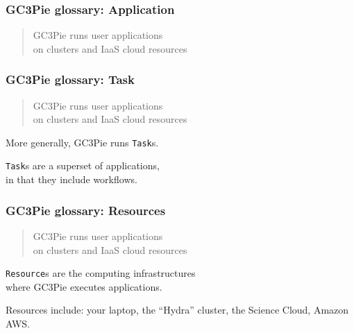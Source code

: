 \documentclass[english,serif,mathserif,usenames,dvipsnames]{beamer}
\begin{document}
\begin{frame}
  \frametitle{GC3Pie glossary: Application}
  \begin{quote}
    GC3Pie runs \alert<2-3>{user applications}
    \\
    on clusters and IaaS cloud resources
  \end{quote}

\end{frame}



\begin{frame}
  \frametitle{GC3Pie glossary: Task}
  \begin{quote}
    GC3Pie \alert{runs} user applications
    \\
    on clusters and IaaS cloud resources
  \end{quote}

  \+ More generally, GC3Pie runs \texttt{Task}s.

  \+ \texttt{Task}s are a superset of applications,
  \\ in that they include workflows.

  \+ \hyperlink{workflows}{}
\end{frame}


\begin{frame}
  \frametitle{GC3Pie glossary: Resources}
  \begin{quote}
    GC3Pie runs user applications
    \\
    on clusters and IaaS cloud \alert{resources}
  \end{quote}

  \+ \alert{\texttt{Resource}s are the computing infrastructures \\ where GC3Pie executes applications.}

  \+ Resources include: your laptop, the ``Hydra'' cluster, the Science Cloud, Amazon AWS.
\end{frame}
\end{document}
